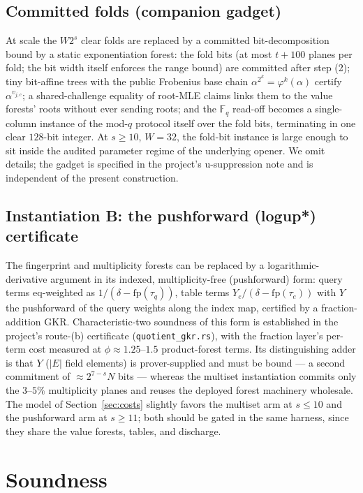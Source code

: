 \documentclass[11pt]{article}
\theoremstyle{definition}
\newcommand{\F}{\mathbb{F}}
\newcommand{\eq}{\mathrm{eq}}
\newcommand{\fp}{\mathrm{fp}}
\begin{document}
\subsection{Committed folds (companion gadget)}\label{sec:committedfolds}
At scale the $W2^s$ clear folds are replaced by a committed
bit-decomposition bound by a static exponentiation forest: the fold bits
(at most $t{+}100$ planes per fold; the bit width itself enforces the
range bound) are committed after step (2); tiny bit-affine trees with the
public Frobenius base chain $\alpha^{2^k}=\varphi^k(\alpha)$ certify
$\alpha^{v_{j,c}}$; a shared-challenge equality of root-MLE claims links
them to the value forests' roots without ever sending roots; and the
$\F_q$ read-off becomes a single-column instance of the mod-$q$ protocol
itself over the fold bits, terminating in one clear $128$-bit integer.
At $s\ge 10$, $W=32$, the fold-bit instance is large enough to sit inside
the audited parameter regime of the underlying opener. We omit details;
the gadget is specified in the project's u-suppression note and is
independent of the present construction.

\subsection{Instantiation B: the pushforward (logup*) certificate}
\label{sec:logup}
The fingerprint and multiplicity forests can be replaced by a
logarithmic-derivative argument in its indexed, multiplicity-free
(pushforward) form: query terms $\eq$-weighted as
$1/(\delta-\fp(\tau_q))$, table terms $Y_e/(\delta-\fp(\tau_e))$ with
$Y$ the pushforward of the query weights along the index map, certified
by a fraction-addition GKR. Characteristic-two soundness of this form is
established in the project's route-(b) certificate
(\texttt{quotient\_gkr.rs}), with the fraction layer's per-term cost
measured at $\phi\approx 1.25$--$1.5$ product-forest terms. Its
distinguishing adder is that $Y$ ($|E|$ field elements) is
prover-supplied and must be bound --- a second commitment of
$\approx 2^{7-s}N$ bits --- whereas the multiset instantiation commits
only the $3$--$5\%$ multiplicity planes and reuses the deployed forest
machinery wholesale. The model of Section~\ref{sec:costs} slightly
favors the multiset arm at $s\le 10$ and the pushforward arm at
$s\ge 11$; both should be gated in the same harness, since they share
the value forests, tables, and discharge.

\section{Soundness}\label{sec:soundness}
\end{document}
